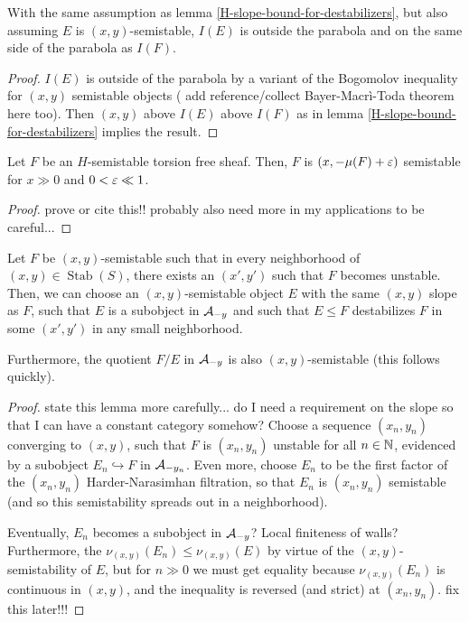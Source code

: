 \documentclass[12pt]{article}
\DeclareMathOperator{\Stab}{Stab}
\begin{document}
\begin{lem}\label{between-parabola}
    With the same assumption as lemma \ref{H-slope-bound-for-destabilizers}, but also assuming $E$ is $(x,y)$-semistable, $I(E)$ is outside the parabola and on the same side of the parabola as $I(F)$.
\end{lem}
\begin{proof}
    $I(E)$ is outside of the parabola by a variant of the Bogomolov inequality for $(x,y)$ semistable objects ({\color{red} add reference/collect Bayer-Macr\`i-Toda theorem here too}). Then $(x,y)$ above $I(E)$ above $I(F)$ as in lemma \ref{H-slope-bound-for-destabilizers} implies the result.
\end{proof}

\begin{lem}\label{large-volume-limit}
    Let $F$ be an $H$-semistable torsion free sheaf. Then, $F$ is $(x,-\mu(F)+\varepsilon)$ semistable for $x\gg 0$ and $0<\varepsilon\ll 1$.
\end{lem}

\begin{proof}
    {\color{red} prove or cite this!! probably also need more in my applications to be careful...}
\end{proof}

\begin{lem}\label{destabilizing-wall-witness}
    Let $F$ be $(x,y)$-semistable such that in every neighborhood of $(x,y) \in \Stab(S)$, there exists an $(x',y')$ such that $F$ becomes unstable. Then, we can choose an $(x,y)$-semistable object $E$ with the same $(x,y)$ slope as $F$, such that $E$ is a subobject in $\mathcal{A}_{-y}$ and such that $E\leq F$ destabilizes $F$ in some $(x',y')$ in any small neighborhood.
    
    Furthermore, the quotient $F/E$ in $\mathcal{A}_{-y}$ is also $(x,y)$-semistable (this follows quickly).
\end{lem}

\begin{proof}
    {\color{red} state this lemma more carefully... do I need a requirement on the slope so that I can have a constant category somehow?} Choose a sequence $(x_n,y_n)$ converging to $(x,y)$, such that $F$ is $(x_n,y_n)$ unstable for all $n\in \mathbb{N}$, evidenced by a subobject $E_n \hookrightarrow F$ in $\mathcal{A}_{-y_n}$. Even more, choose $E_n$ to be the first factor of the $(x_n,y_n)$ Harder-Narasimhan filtration, so that $E_n$ is $(x_n,y_n)$ semistable (and so this semistability spreads out in a neighborhood).
    
    Eventually, $E_n$ becomes a subobject in $\mathcal{A}_{-y}$? Local finiteness of walls? Furthermore, the $\nu_{(x,y)}(E_n) \leq \nu_{(x,y)}(E)$ by virtue of the $(x,y)$-semistability of $E$, but for $n\gg 0$ we must get equality because $\nu_{(x,y)}(E_n)$ is continuous in $(x,y)$, and the inequality is reversed (and strict) at $(x_n,y_n)$. {\color{red} fix this later!!!}
\end{proof}
\end{document}
